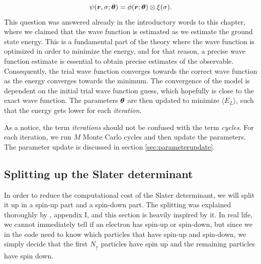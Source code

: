 \begin{equation}
\psi(\boldsymbol{{r}},\sigma;\boldsymbol{{\theta}})=\phi(\boldsymbol{{r}};\boldsymbol{{\theta}})\otimes\xi(\sigma).
\end{equation}
\iffalse
This question was answered already in the introductory words to this chapter, where we claimed that the wave function is estimated as we estimate the ground state energy. This is a fundamental part of the theory where the wave function is optimized in order to minimize the energy, and for that reason, a precise wave function estimate is essential to obtain precise estimates of the observable.
Consequently, the trial wave function converges towards the correct wave function as the energy converges towards the minimum. The convergence of the model is dependent on the initial trial wave function guess, which hopefully is close to the exact wave function. The parameters $\boldsymbol{{\theta}}$ are then updated to minimize $\langle E_L\rangle$, such that the energy gets lower for each \textit{iteration}.

As a notice, the term \textit{iterations} should not be confused with the term \textit{cycles}. For each iteration, we run $M$ Monte Carlo cycles and then update the parameters. The parameter update is discussed in section \ref{sec:parameterupdate}.

\subsection{Splitting up the Slater determinant} \label{sec:splittingofslater}
In order to reduce the computational cost of the Slater determinant, we will split it up in a spin-up part and a spin-down part. The splitting was explained thoroughly by \citet{nissenbaum_stochastic_2008}, appendix I, and this section is heavily inspired by it. In real life, we cannot immediately tell if an electron has spin-up or spin-down, but since we in the code need to know which particles that have spin-up and spin-down, we simply decide that the first $N_{\uparrow}$ particles have spin up and the remaining particles have spin down. 

